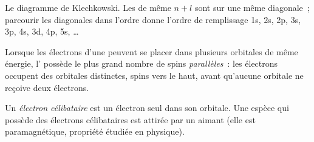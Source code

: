\begin{omfigure}

{\small Le diagramme de Klechkowski. Les  de même $n + l$
sont sur une même diagonale~; parcourir les diagonales dans l'ordre
donne l'ordre de remplissage 1s, 2s, 2p, 3s, 3p, 4s, 3d, 4p, 5s, \dots}
\end{omfigure}

\begin{proposition}\label{prop:b1:quantum-numbers:hund}
Lorsque les électrons d'une  peuvent se placer dans plusieurs
orbitales de même énergie, l' possède le plus grand
nombre de spins \emph{parallèles}~: les électrons occupent des orbitales
distinctes, spins vers le haut, avant qu'aucune orbitale ne reçoive deux
électrons.
\end{proposition}
\admitted

\begin{definition}\label{def:b1:quantum-numbers:unpaired}
Un \emph{électron célibataire} est un électron seul
dans son orbitale. Une espèce qui possède des électrons célibataires est
attirée par un aimant (elle est paramagnétique, propriété étudiée en
physique).
\end{definition}


